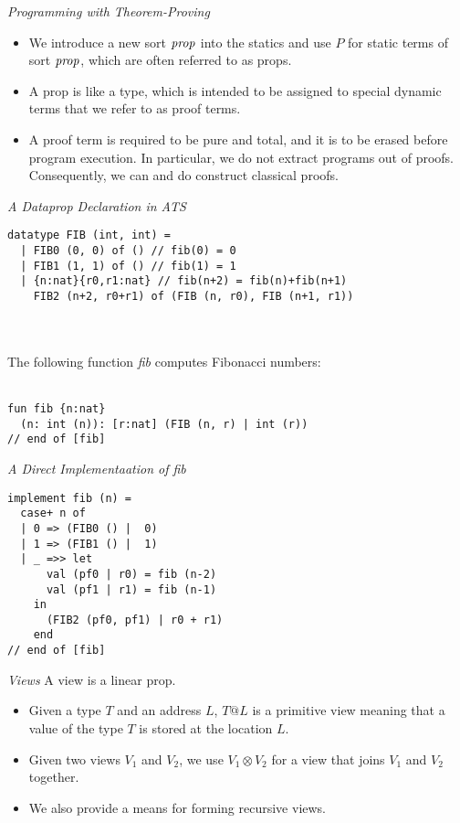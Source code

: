 \documentclass[pdf]{prosper}
\begin{document}
\begin{slide}{\em Programming with Theorem-Proving}
\begin{itemize}
\item
We introduce a new sort ${\it prop}$ into the statics and use $P$ for static
terms of sort ${\it prop}$, which are often referred to as props.
\item
A prop is like a type, which is intended to be assigned to special dynamic
terms that we refer to as proof terms.
\item
A proof term is required to be pure and total, and it is to be erased
before program execution. In particular, we do not extract programs out of
proofs. Consequently, we can and do construct classical proofs.
\end{itemize}
\end{slide}
\begin{slide}{\em A Dataprop Declaration in ATS}
{\blue\begin{verbatim}
datatype FIB (int, int) =
  | FIB0 (0, 0) of () // fib(0) = 0
  | FIB1 (1, 1) of () // fib(1) = 1
  | {n:nat}{r0,r1:nat} // fib(n+2) = fib(n)+fib(n+1)
    FIB2 (n+2, r0+r1) of (FIB (n, r0), FIB (n+1, r1))
\end{verbatim}
}~\\~\\
The following function {\it fib} computes Fibonacci numbers:\\~\\
{\blue\begin{verbatim}
fun fib {n:nat}
  (n: int (n)): [r:nat] (FIB (n, r) | int (r))
// end of [fib]
\end{verbatim}
}
\vfill
\end{slide}
\begin{slide}{\em A Direct Implementaation of {\it fib}}
{\blue\begin{verbatim}
implement fib (n) =
  case+ n of
  | 0 => (FIB0 () |  0)
  | 1 => (FIB1 () |  1)
  | _ =>> let
      val (pf0 | r0) = fib (n-2)
      val (pf1 | r1) = fib (n-1)
    in
      (FIB2 (pf0, pf1) | r0 + r1)
    end
// end of [fib]
\end{verbatim}
}
\end{slide}
\begin{slide}{\em Views}
A view is a linear prop.
\begin{itemize}
\item
Given a type $T$ and an address $L$, $T@L$ is a primitive view
meaning that a value of the type $T$ is stored at the location $L$.
\item
Given two views $V_1$ and $V_2$, we use $V_1\otimes V_2$ for a
view that joins $V_1$ and $V_2$ together.
\item
We also provide a means for forming recursive views. 
\end{itemize}
\end{slide}
\end{document}
